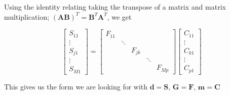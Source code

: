 Using the identity relating taking the transpose of a matrix and matrix multiplication; $(\mathbf{AB})^T = \mathbf{B}^T \mathbf{A}^T$, we get


\begin{equation*}
\begin{bmatrix}
S_{11}\\
\vdots \\
S_{j1} \\
\vdots \\
S_{M1}
\end{bmatrix}
=
\begin{bmatrix}
F_{11} & & & & \\
& \ddots & & & \\
& & F_{jk} & & \\
& & & \ddots & \\
& & & & F_{Mp}
\end{bmatrix}
\begin{bmatrix}
C_{11}\\
\vdots \\
C_{k1} \\
\vdots \\
C_{p1}
\end{bmatrix}
\end{equation*}

This gives us the form  we are looking for with $\mathbf{d = S}$, $\mathbf{G = F}$, $\mathbf{m = C}$